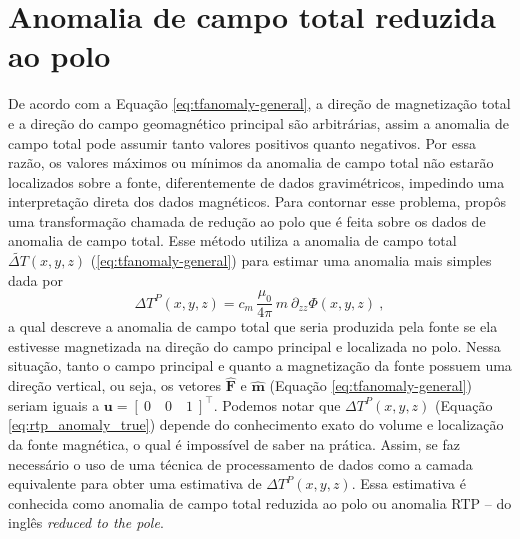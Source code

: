 \section{Anomalia de campo total reduzida ao polo}

De acordo com a Equação \ref{eq:tfanomaly-general}, a direção de magnetização total e a direção do campo geomagnético principal são arbitrárias, assim a anomalia de campo total pode assumir tanto valores positivos quanto negativos.
Por essa razão, os valores máximos ou mínimos da anomalia de campo total não estarão localizados sobre a fonte, diferentemente de dados gravimétricos, impedindo uma interpretação direta dos dados magnéticos. 
Para contornar esse problema, \citet{baranov1957} propôs uma transformação chamada de redução ao polo que é feita sobre os dados de anomalia de campo total.
Esse método utiliza a anomalia de campo total $\tilde{\Delta T}(x, y, z)$ (\ref{eq:tfanomaly-general}) para estimar uma anomalia mais simples dada por
\begin{equation}
\Delta T^{P}(x, y, z) = c_{m} \, \frac{\mu_{0}}{4\pi} \, m \: \partial_{zz} \Phi(x, y, z) \: ,
\label{eq:rtp_anomaly_true}
\end{equation}
a qual descreve a anomalia de campo total que seria produzida pela fonte se ela estivesse magnetizada na direção do campo principal e localizada no polo. Nessa situação, tanto o campo principal e quanto a magnetização da fonte possuem uma direção vertical, ou seja, os vetores $\hat{\mathbf{F}}$ e 
$\hat{\mathbf{m}}$ (Equação \ref{eq:tfanomaly-general}) 
seriam iguais a $\mathbf{u} = \left[\:0 \quad 0 \quad 1 \: \right]^{\top}$.
Podemos notar que  $\Delta T^{P}(x, y, z)$ (Equação \ref{eq:rtp_anomaly_true}) depende do conhecimento exato do volume e localização da fonte magnética, o qual é impossível de saber na prática. Assim, se faz necessário o uso de uma técnica de processamento de dados como a camada equivalente para obter uma estimativa de $ \Delta T^{P}(x, y, z) $.
Essa estimativa é conhecida como anomalia de campo total reduzida ao polo ou anomalia RTP -- do inglês \textit{reduced to the pole}.

